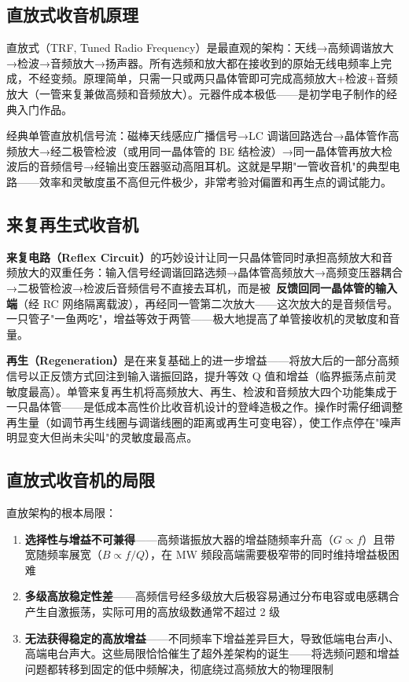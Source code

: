 \documentclass[12pt,UTF8]{ctexbook}
\begin{document}
\subsection{直放式收音机原理}

直放式（TRF, Tuned Radio Frequency）是最直观的架构：天线→高频调谐放大→检波→音频放大→扬声器。所有选频和放大都在接收到的原始无线电频率上完成，不经变频。原理简单，只需一只或两只晶体管即可完成高频放大+检波+音频放大（一管来复兼做高频和音频放大）。元器件成本极低——是初学电子制作的经典入门作品。

经典单管直放机信号流：磁棒天线感应广播信号→LC 调谐回路选台→晶体管作高频放大→经二极管检波（或用同一晶体管的 BE 结检波）→同一晶体管再放大检波后的音频信号→经输出变压器驱动高阻耳机。这就是早期"一管收音机"的典型电路——效率和灵敏度虽不高但元件极少，非常考验对偏置和再生点的调试能力。

\subsection{来复再生式收音机}

\textbf{来复电路（Reflex Circuit）}的巧妙设计让同一只晶体管同时承担高频放大和音频放大的双重任务：输入信号经调谐回路选频→晶体管高频放大→高频变压器耦合→二极管检波→检波后音频信号不直接去耳机，而是被\ \textbf{反馈回同一晶体管的输入端}（经 RC 网络隔离载波），再经同一管第二次放大——这次放大的是音频信号。一只管子"一鱼两吃"，增益等效于两管——极大地提高了单管接收机的灵敏度和音量。

\textbf{再生（Regeneration）}是在来复基础上的进一步增益——将放大后的一部分高频信号以正反馈方式回注到输入谐振回路，提升等效 Q 值和增益（临界振荡点前灵敏度最高）。单管来复再生机将高频放大、再生、检波和音频放大四个功能集成于一只晶体管——是低成本高性价比收音机设计的登峰造极之作。操作时需仔细调整再生量（如调节再生线圈与调谐线圈的距离或再生可变电容），使工作点停在"噪声明显变大但尚未尖叫"的灵敏度最高点。

\subsection{直放式收音机的局限}

直放架构的根本局限：
\begin{enumerate}
\item \textbf{选择性与增益不可兼得}——高频谐振放大器的增益随频率升高（$G\propto f$）且带宽随频率展宽（$B\propto f/Q$），在 MW 频段高端需要极窄带的同时维持增益极困难
\item \textbf{多级高放稳定性差}——高频信号经多级放大后极容易通过分布电容或电感耦合产生自激振荡，实际可用的高放级数通常不超过 2 级
\item \textbf{无法获得稳定的高放增益}——不同频率下增益差异巨大，导致低端电台声小、高端电台声大。这些局限恰恰催生了超外差架构的诞生——将选频问题和增益问题都转移到固定的低中频解决，彻底绕过高频放大的物理限制
\end{enumerate}
\end{document}

